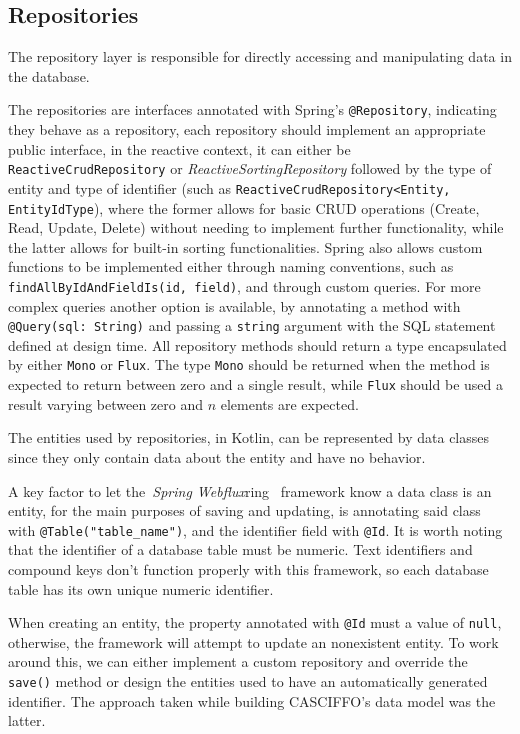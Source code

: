 \subsection{Repositories}\label{subsec:repositories}
The repository layer is responsible for directly accessing and manipulating data in the database. 

The repositories are interfaces annotated with Spring's \texttt{@Repository}, indicating they behave as a repository, each repository should implement an appropriate public interface, in the reactive context, it can either be \texttt{ReactiveCrudRepository} or \textit{ReactiveSortingRepository} followed by the type of entity and type of identifier (such as \texttt{ReactiveCrudRepository<Entity, EntityIdType}), where the former allows for basic CRUD operations (Create, Read, Update, Delete) without needing to implement further functionality, while the latter allows for built-in sorting functionalities. Spring also allows custom functions to be implemented either through naming conventions, such as \texttt{findAllByIdAndFieldIs(id, field)}, and through custom queries. For more complex queries another option is available, by annotating a method with \texttt{@Query(sql: String)} and passing a \texttt{string} argument with the SQL statement defined at design time. All repository methods should return a type encapsulated by either \texttt{Mono} or \texttt{Flux}. The type \texttt{Mono} should be returned when the method is expected to return between zero and a single result, while \texttt{Flux} should be used a result varying between zero and $n$ elements are expected. 

The entities used by repositories, in Kotlin, can be represented by data classes since they only contain data about the entity and have no behavior. 

A key factor to let the~\textit{Spring Webflux}ring~\cite{spring-webflux} framework know a data class is an entity, for the main purposes of saving and updating, is annotating said class with \texttt{@Table("table\_name")}, and the identifier field with \texttt{@Id}. It is worth noting that the identifier of a database table must be numeric. Text identifiers and compound keys don't function properly with this framework, so each database table has its own unique numeric identifier. 

When creating an entity, the property annotated with \texttt{@Id} must a value of \texttt{null}, otherwise, the framework will attempt to update an nonexistent entity. To work around this, we can either implement a custom repository and override the \texttt{save()} method or design the entities used to have an automatically generated identifier. The approach taken while building CASCIFFO's data model was the latter.

